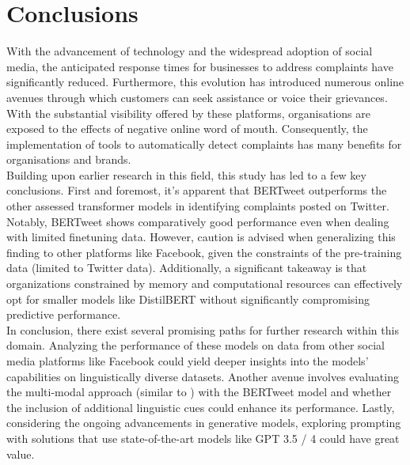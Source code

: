 \chapter{Conclusions}

With the advancement of technology and the widespread adoption of social media, the anticipated response times for businesses to address complaints have significantly reduced. Furthermore, this evolution has introduced numerous online avenues through which customers can seek assistance or voice their grievances. With the substantial visibility offered by these platforms, organisations are exposed to the effects of negative online word of mouth. Consequently, the implementation of tools to automatically detect complaints has many benefits for organisations and brands.\\

Building upon earlier research in this field, this study has led to a few key conclusions. First and foremost, it's apparent that BERTweet outperforms the other assessed transformer models in identifying complaints posted on Twitter. Notably, BERTweet shows comparatively good performance even when dealing with limited finetuning data. However, caution is advised when generalizing this finding to other platforms like Facebook, given the constraints of the pre-training data (limited to Twitter data). Additionally, a significant takeaway is that organizations constrained by memory and computational resources can effectively opt for smaller models like DistilBERT without significantly compromising predictive performance.\\

In conclusion, there exist several promising paths for further research within this domain. Analyzing the performance of these models on data from other social media platforms like Facebook could yield deeper insights into the models' capabilities on linguistically diverse datasets. Another avenue involves evaluating the multi-modal approach (similar to \cite{jinModelingSeverityComplaints2021}) with the BERTweet model and whether the inclusion of additional linguistic cues could enhance its performance. Lastly, considering the ongoing advancements in generative models, exploring prompting with solutions that use state-of-the-art models like GPT 3.5 / 4 could have great value.
